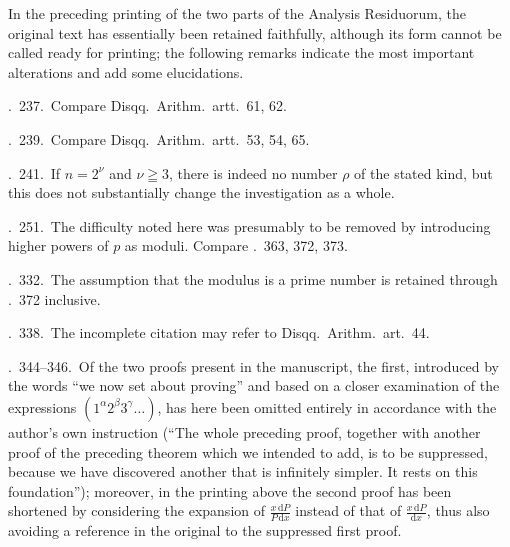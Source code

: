 In the preceding printing of the two parts of the Analysis Residuorum, the original text has essentially been retained faithfully, although its form cannot be called ready for printing; the following remarks indicate the most important alterations and add some elucidations.

\textsection.\ 237.\ Compare Disqq.\ Arithm.\ artt.\ 61, 62.

\textsection.\ 239.\ Compare Disqq.\ Arithm.\ artt.\ 53, 54, 65.

\textsection.\ 241.\ If $n=2^\nu$ and $\nu\geqq3$, there is indeed no number $\rho$ of the stated kind, but this does not substantially change the investigation as a whole.

\textsection.\ 251.\ The difficulty noted here was presumably to be removed by introducing higher powers of $p$ as moduli. Compare \textsection\textsection.\ 363, 372, 373.

\textsection.\ 332.\ The assumption that the modulus is a prime number is retained through \textsection.\ 372 inclusive.

\textsection.\ 338.\ The incomplete citation may refer to Disqq.\ Arithm.\ art.\ 44.

\textsection\textsection.\ 344--346.\ Of the two proofs present in the manuscript, the first, introduced by the words ``we now set about proving'' and based on a closer examination of the expressions $(1^\alpha2^\beta3^\gamma\ldots)$, has here been omitted entirely in accordance with the author's own instruction (``The whole preceding proof, together with another proof of the preceding theorem which we intended to add, is to be suppressed, because we have discovered another that is infinitely simpler. It rests on this foundation''); moreover, in the printing above the second proof has been shortened by considering the expansion of $\frac{x\,\mathrm{d}P}{P\,\mathrm{d}x}$ instead of that of $\frac{x\,\mathrm{d}P}{\mathrm{d}x}$, thus also avoiding a reference in the original to the suppressed first proof.

